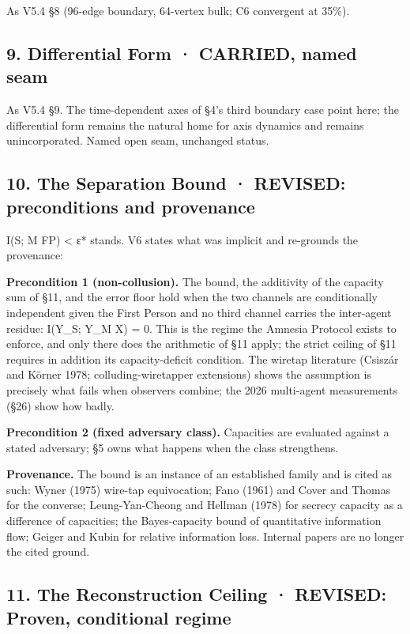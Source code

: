 \documentclass[
]{article}
\begin{document}
As V5.4 §8 (96-edge boundary, 64-vertex bulk; C6 convergent at 35\%).

\subsection{9. Differential Form · CARRIED, named
seam}\label{differential-form-carried-named-seam}

As V5.4 §9. The time-dependent axes of §4's third boundary case point
here; the differential form remains the natural home for axis dynamics
and remains unincorporated. Named open seam, unchanged status.

\subsection{10. The Separation Bound · REVISED: preconditions and
provenance}\label{the-separation-bound-revised-preconditions-and-provenance}

I(S; M \textbar{} FP) \textless{} ε* stands. V6 states what was implicit
and re-grounds the provenance:

\textbf{Precondition 1 (non-collusion).} The bound, the additivity of
the capacity sum of §11, and the error floor hold when the two channels
are conditionally independent given the First Person and no third
channel carries the inter-agent residue: I(Y\_S; Y\_M \textbar{} X) = 0.
This is the regime the Amnesia Protocol exists to enforce, and only
there does the arithmetic of §11 apply; the strict ceiling of §11
requires in addition its capacity-deficit condition. The wiretap
literature (Csiszár and Körner 1978; colluding-wiretapper extensions)
shows the assumption is precisely what fails when observers combine; the
2026 multi-agent measurements (§26) show how badly.

\textbf{Precondition 2 (fixed adversary class).} Capacities are
evaluated against a stated adversary; §5 owns what happens when the
class strengthens.

\textbf{Provenance.} The bound is an instance of an established family
and is cited as such: Wyner (1975) wire-tap equivocation; Fano (1961)
and Cover and Thomas for the converse; Leung-Yan-Cheong and Hellman
(1978) for secrecy capacity as a difference of capacities; the
Bayes-capacity bound of quantitative information flow; Geiger and Kubin
for relative information loss. Internal papers are no longer the cited
ground.

\subsection{11. The Reconstruction Ceiling · REVISED: Proven,
conditional
regime}\label{the-reconstruction-ceiling-revised-proven-conditional-regime}
\end{document}

